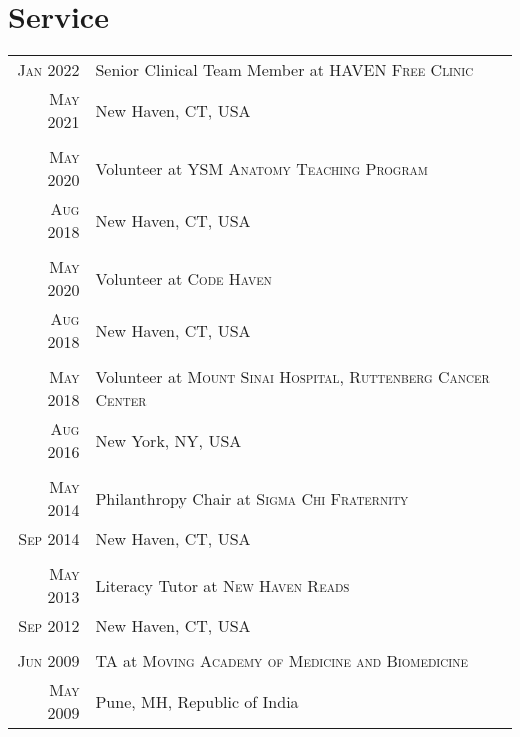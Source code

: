 \documentclass[a4paper,10pt]{article}
\begin{document}
\section{Service}
\begin{longtable}{r|p{11cm}}
 \nopagebreak \textsc{Jan 2022} & Senior Clinical Team Member at \textsc{HAVEN Free Clinic}\\
 \nopagebreak \textsc{May 2021} &  \small{New Haven, CT, USA}\\
 \multicolumn{2}{c}{} \\
 \nopagebreak \textsc{May 2020} & Volunteer at \textsc{YSM Anatomy Teaching Program} \\
 \nopagebreak \textsc{Aug 2018} &  \small{New Haven, CT, USA}\\
 \multicolumn{2}{c}{} \\
  \nopagebreak \textsc{May 2020} & Volunteer at \textsc{Code Haven} \\
 \nopagebreak \textsc{Aug 2018} &  \small{New Haven, CT, USA}\\
 \multicolumn{2}{c}{} \\
 \nopagebreak \textsc{May 2018} & Volunteer at \textsc{Mount Sinai Hospital, Ruttenberg Cancer Center} \\
 \nopagebreak \textsc{Aug 2016} &  \small{New York, NY, USA}\\
 \multicolumn{2}{c}{} \\
 \nopagebreak \textsc{May 2014} & Philanthropy Chair at \textsc{Sigma Chi Fraternity}\\
 \nopagebreak \textsc{Sep 2014} & \small{New Haven, CT, USA} \\
 \multicolumn{2}{c}{} \\
 \nopagebreak \textsc{May 2013} & Literacy Tutor at \textsc{New Haven Reads}\\
 \nopagebreak \textsc{Sep 2012} & \small{New Haven, CT, USA} \\
 \multicolumn{2}{c}{} \\
 \nopagebreak \textsc{Jun 2009} & TA at \textsc{Moving Academy of Medicine and Biomedicine} \\
 \nopagebreak \textsc{May 2009} & \small{Pune, MH, Republic of India} \\
\end{longtable}

\end{document}
